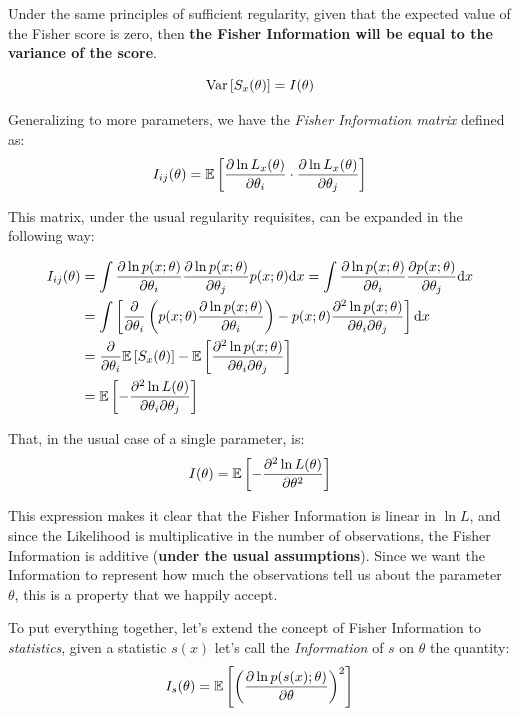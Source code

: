 Under the same principles of sufficient regularity, given that the expected value of the Fisher score is zero, then \textbf{the Fisher Information will be equal to the variance of the score}. 

	\[
	\operatorname{Var}\left[S_x(\theta)\right] = I(\theta)
	\]

Generalizing to more parameters, we have the \emph{Fisher Information matrix} defined as:
	\[
	I_{ij}(\theta) = \mathbb{E}\left[ \frac{\partial \ln L_x(\theta)}{\partial \theta_i}\cdot \frac{\partial \ln L_x(\theta)}{\partial \theta_j}\right]
	\]

This matrix, under the usual regularity requisites, can be expanded in the following way:

\begin{align*}
	I_{ij}(\theta) &= \int \frac{\partial \ln p(x;\theta)}{\partial \theta_i} \frac{\partial \ln p(x;\theta)}{\partial \theta_j} p(x;\theta)\mathrm{d} x = \int \frac{\partial \ln p(x;\theta)}{\partial \theta_i} \frac{\partial p(x;\theta)}{\partial \theta_j} \mathrm{d} x \\
	&= \int\left[ \frac{\partial}{\partial\theta_i}\left(p(x;\theta)\frac{\partial \ln p(x;\theta)}{\partial \theta_i}\right) - p(x;\theta)\frac{\partial^2\ln p(x;\theta)}{\partial \theta_i \partial\theta_j}\right]\mathrm{d} x \\
	&= \frac{\partial}{\partial \theta_i}\mathbb{E}\left[S_x(\theta)\right] - \mathbb{E}\left[\frac{\partial^2 \ln p(x;\theta)}{\partial \theta_i\partial\theta_j}\right] \\ 
	&= \mathbb{E}\left[-\frac{\partial^2\ln L(\theta)}{\partial\theta_i\partial\theta_j}\right]
\end{align*}

That, in the usual case of a single parameter, is:
\[
	I(\theta)=\mathbb{E}\left[-\frac{\partial^2\ln L(\theta)}{\partial\theta^2}\right]
\]

This expression makes it clear that the Fisher Information is linear in $\ln L$, and since the Likelihood is multiplicative in the number of observations, the Fisher Information is additive (\textbf{under the usual assumptions}). Since we want the Information to represent how much the observations tell us about the parameter $\theta$, this is a property that we happily accept.

To put everything together, let's extend the concept of Fisher Information to \emph{statistics}, given a statistic $s(x)$ let's call the \emph{Information} of $s$ on $\theta$ the quantity:
	\[
	I_s(\theta) = \mathbb{E} \left[\left( \frac{\partial\ln p(s(x);\theta)}{\partial \theta}\right)^2 \right] 
	\]
	
